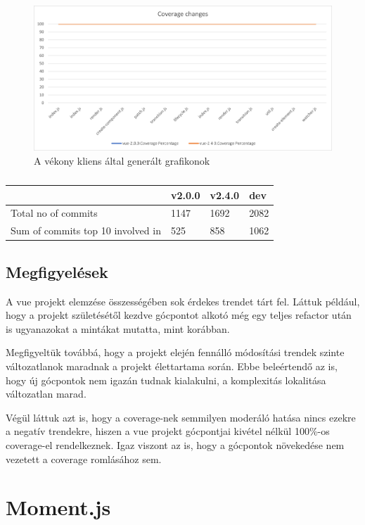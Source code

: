 \begin{figure}[H]
    \centering
    \includegraphics[width=1\textwidth]{images/vue/vue-all-coverage.png}
    \caption{A vékony kliens által generált grafikonok}
    \label{fig:vue-all-coverage}
\end{figure}

\begin{table}[h]
    \centering
    \begin{tabular}{l|l|l|l}
                                          & v2.0.0 & v2.4.0 & dev  \\ \hline
        Total no of commits               & 1147   & 1692   & 2082 \\
        Sum of commits top 10 involved in & 525    & 858    & 1062
    \end{tabular}
    \caption{}\label{tab:my-table}
\end{table}

\subsection{Megfigyelések}

A vue projekt elemzése összességében sok érdekes trendet tárt fel. Láttuk például, hogy a projekt születésétől kezdve gócpontot alkotó  még egy teljes refactor után is ugyanazokat a mintákat mutatta, mint korábban.

Megfigyeltük továbbá, hogy a projekt elején fennálló módosítási trendek szinte változatlanok maradnak a projekt élettartama során. Ebbe beleértendő az is, hogy új gócpontok nem igazán tudnak kialakulni, a komplexitás lokalitása változatlan marad.

Végül láttuk azt is, hogy a coverage-nek semmilyen moderáló hatása nincs ezekre a negatív trendekre, hiszen a vue projekt gócpontjai kivétel nélkül 100\%-os coverage-el rendelkeznek. Igaz viszont az is, hogy a gócpontok növekedése nem vezetett a coverage romlásához sem.

\section{Moment.js}
